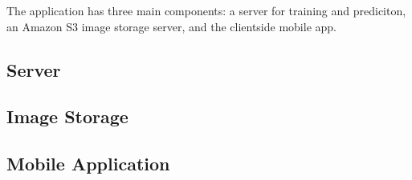 The application has three main components: a server for training and prediciton, an Amazon S3 image storage server, and the clientside mobile app.

\subsection{Server}

\subsection{Image Storage}

\subsection{Mobile Application}